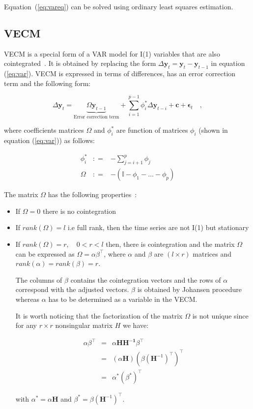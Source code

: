 Equation~(\ref{eq:vareq})  can be solved using ordinary least squares estimation.

\subsection{VECM}

VECM is a special form of a VAR model for I(1) variables that are also
cointegrated~\cite{banerjee1993}. It is obtained by replacing the form $\Delta
\mathbf{y}_t = \mathbf{y}_t - \mathbf{y}_{t-1}$ in equation (\ref{eq:var}).
VECM is expressed in terms of differences, has an error correction term and 
the following form:

\begin{equation}
 \label{eq:vec}
 \Delta \mathbf{y}_t = 
 \underbrace{ \Omega\mathbf{y}_{t-1}}_\text{Error correction term} + 
 \sum_{i=1}^{p-1}
\phi_i^* \Delta \mathbf{y}_{t-i}  + \mathbf{c} + \mathbf{\epsilon}_t \quad ,
\end{equation}

\noindent where coefficients matrices $\Omega$ and $\phi_i^*$ are
function of matrices $\phi_i$ (shown in equation (\ref{eq:var})) as follows:

\begin{eqnarray*}
\phi_i^* &: =& -\sum_{j=i+1}^{p} \phi_j \\
\Omega &: =& -(\mathbb{I}-\phi_1-\dots-\phi_p) 
\end{eqnarray*}

The matrix $\Omega$ has the following properties~\cite{johansen1995}:
\begin{itemize}
\item If $\Omega = 0$ there is no cointegration
\item If $rank(\Omega)=l$ i.e full rank, then the time series are not
I(1) but stationary
\item If $rank(\Omega)=r,\quad 0 < r < l$ then, there is cointegration
and the matrix $\Omega$ can be expressed as $\Omega =
\alpha \beta^\top$, where $\alpha$ and $\beta$ are $(l \times r)$
matrices and $rank(\alpha)=rank(\beta)=r$.

The columns of $\beta$ contains the cointegration vectors and the rows of
$\alpha$ correspond with the adjusted vectors. $\beta$ is obtained by Johansen
procedure~\cite{johansen1988} whereas $\alpha$ has to be determined as a
variable in the VECM.

It is worth noticing that the factorization of the matrix $\Omega$ is not
unique since for any $r \times r$ nonsingular matrix $H$ we have:

\begin{eqnarray*}
\alpha \beta^\top &=& \alpha \mathbf{HH^{-1}} \beta^\top\\
&=&(\alpha\mathbf{H})(\beta(\mathbf{H}^{-1})^\top)^\top \\
&=& \alpha^*(\beta^*)^\top
\end{eqnarray*}

\noindent with $\alpha^* = \alpha\mathbf{H}$ and $\beta^* =
\beta(\mathbf{H}^{-1})^\top$.


\end{itemize}


